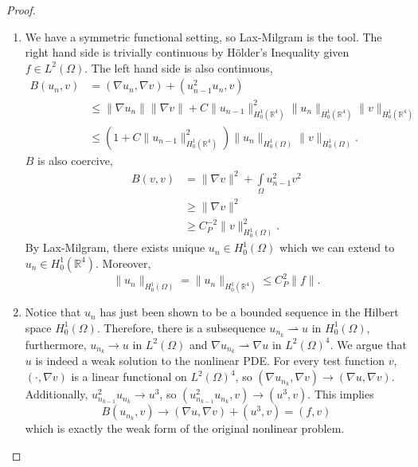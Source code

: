 \documentclass[letterpaper,twoside,11pt]{article}
\theoremstyle{mystyle}
\newcommand{\R}{{\mathbb R}}
\newcommand{\cbk}{\color{black}}
\newcommand{\cred}{\color{red}}
\begin{document}
\begin{proof}
\begin{enumerate}
    \item We have a symmetric functional setting, so Lax-Milgram is the tool. The right hand side is trivially continuous by H\"older's Inequality given $f \in L^2 (\Omega)$. The left hand side is also continuous, 
    \begin{align*}
      B(u_n,v) &= \left( \nabla u_n, \nabla v \right) + \left( u_{n-1}^2 u_n ,v \right)\\
      &\leq \|\nabla u_n\| \|\nabla v\| + C\|u_{n-1}\|^2_{H_0^1(\R^4)} \|u_n \|_{H_0^1(\R^4)} \|v\|_{H_0^1(\R^4)} \\
      &\leq \left( 1+C\|u_{n-1}\|^2_{H_0^1(\R^4)} \right)\|u_n \|_{H_0^1(\Omega)} \|v\|_{H_0^1(\Omega)}.
    \end{align*}
    \(B\) is also coercive, 
    \begin{align*}
      B\left( v, v \right) &= \|\nabla v\|^2 + \int\limits_\Omega u_{n-1}^2 v^2 \\ 
      &\geq \|\nabla v\|^2 \\
      &\geq C_P^{-2} \|v\|_{H^1_0(\Omega)}^2.
    \end{align*}
    By Lax-Milgram, there exists unique $u_n \in H_0^1 \left( \Omega \right)$ which we can extend to $u_n \in H_0^1 \left( \R^4 \right)$. Moreover, 
    \[\|u_n\|_{H^1_0 \left( \Omega \right)} = \|u_n\|_{H^1_0 \left( \R^4 \right)} \leq C_P^2 \|f\|.\] 
    \item \cred Notice that $u_n$ has just been shown to be a bounded sequence in the Hilbert space $H_0^1 \left( \Omega \right)$. Therefore, there is a subsequence $u_{n_k} \rightharpoonup u$ in $H_0^1(\Omega)$, furthermore, $u_{n_k} \to u$ in $L^2 (\Omega)$ and $\nabla u_{n_k} \rightharpoonup \nabla u$ in $L^2 (\Omega)^{4}$. 
    We argue that $u$ is indeed a weak solution to the nonlinear PDE. For every test function $v$, $\left( \cdot, \nabla v \right)$ is a linear functional on $L^2(\Omega)^4$, so $\left( \nabla u_{n_k}, \nabla v \right) \to \left( \nabla u, \nabla v \right)$. Additionally, $u_{n_{k-1}}^2 u_{n_k} \to u^3$, so $\left( u_{n_{k-1}}^2 u_{n_k} ,v \right) \to \left( u^3, v \right)$. This implies 
    \[B(u_{n_k}, v) \to \left( \nabla u, \nabla v \right) + \left( u^3, v \right) = \left( f, v \right)\]
    which is exactly the weak form of the original nonlinear problem. 
  \end{enumerate}
\end{proof}
\cbk 
\end{document}
